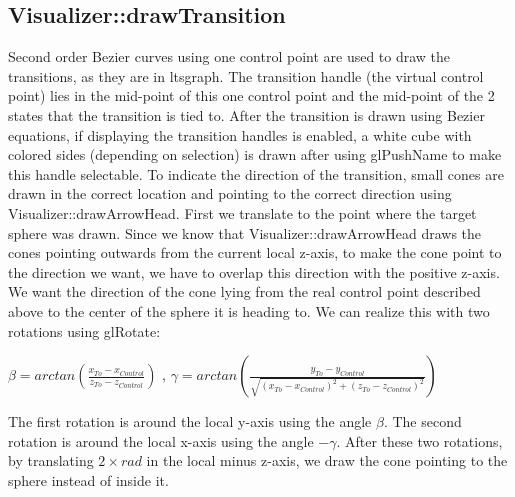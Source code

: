 \documentclass[a4paper]{article}
\begin{document}
\subsection{Visualizer::drawTransition}
Second order Bezier curves using one control point are used to draw the transitions, as they are in ltsgraph. The transition handle (the virtual control point) lies in the mid-point of this one control point and the mid-point of the 2 states that the transition is tied to. After the transition is drawn using Bezier equations, if displaying the transition handles is enabled, a white cube with colored sides (depending on selection) is drawn after using glPushName to make this handle selectable. To indicate the direction of the transition, small cones are drawn in the correct location and pointing to the correct direction using Visualizer::drawArrowHead. First we translate to the point where the target sphere was drawn. Since we know that Visualizer::drawArrowHead draws the cones pointing outwards from the current local z-axis, to make the cone point to the direction we want, we have to overlap this direction with the positive z-axis. We want the direction of the cone lying from the real control point described above to the center of the sphere it is heading to. We can realize this with two rotations using glRotate:
\begin{center}
\begin{math}
\beta = arctan\left(\frac{x_{To} - x_{Control}}{z_{To} - z_{Control}}\right)
\end{math}
,
\begin{math}
\gamma = arctan\left(\frac{y_{To} - y_{Control}}{\sqrt{(x_{To} - x_{Control})^2 + (z_{To} - z_{Control})^2}}\right)
\end{math}
\end{center}
The first rotation is around the local y-axis using the angle $\beta$. The second rotation is around the local x-axis using the angle $-\gamma$. After these two rotations, by translating $2 \times rad$ in the local minus z-axis, we draw the cone pointing to the sphere instead of inside it.
\end{document}
